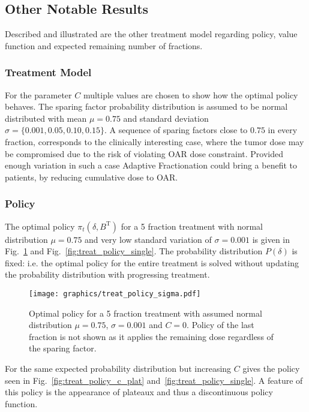 \documentclass[\relativeRoot/ada.tex]{subfiles}
\begin{document}

\subsection{Other Notable Results}

Described and illustrated are the other treatment model regarding policy, value function and expected remaining number of fractions.

\subsubsection{Treatment Model}

For the parameter $C$ multiple values are chosen to show how the optimal policy behaves. The sparing factor probability distribution is assumed to be normal distributed with mean $\mu=0.75$ and standard deviation $\sigma = \{ 0.001, 0.05, 0.10, 0.15\}$. A sequence of sparing factors close to $0.75$ in every fraction, corresponds to the clinically interesting case, where the tumor dose may be compromised due to the risk of violating OAR dose constraint. Provided enough variation in such a case Adaptive Fractionation could bring a benefit to patients, by reducing cumulative dose to OAR.

\subsubsection{Policy}

The optimal policy $\pi_t(\delta, B^{\text{T}})$ for a 5 fraction treatment with normal distribution $\mu=0.75$ and very low standard variation of $\sigma=0.001$ is given in Fig.~\ref{fig:treat_policy_sigma} and Fig.~\ref{fig:treat_policy_single}. The probability distribution $P(\delta)$ is fixed: i.e. the optimal policy for the entire treatment is solved without updating the probability distribution with progressing treatment.

\begin{figure}[!htb]
    \centering
    \texttt{[image: graphics/treat\_policy\_sigma.pdf]}
    \caption{Optimal policy for a 5 fraction treatment with assumed normal distribution $\mu=0.75$, $\sigma=0.001$ and $C=0$. Policy of the last fraction is not shown as it applies the remaining dose regardless of the sparing factor.}
    \label{fig:treat_policy_sigma}
\end{figure}

For the same expected probability distribution but increasing $C$ gives the policy seen in Fig.~\ref{fig:treat_policy_c_plat} and~\ref{fig:treat_policy_single}. A feature of this policy is the appearance of plateaux and thus a discontinuous policy function.
\end{document}
